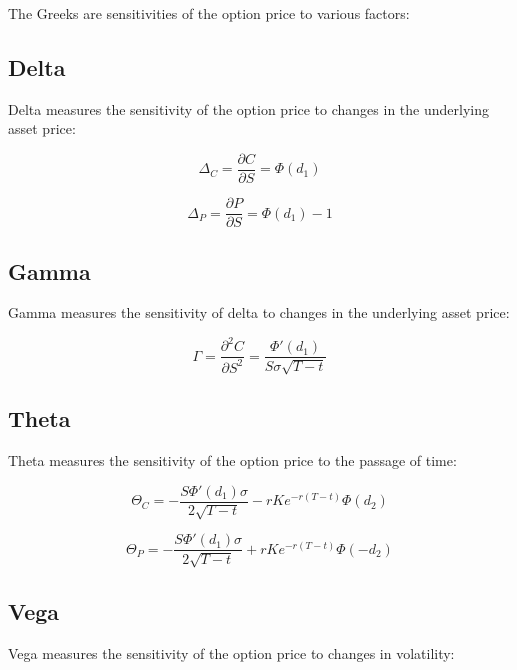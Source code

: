 \documentclass[../Main.tex]{subfiles}
\begin{document}
The Greeks are sensitivities of the option price to various factors:

\subsection{Delta}

Delta measures the sensitivity of the option price to changes in the underlying asset price:

\begin{equation}
    \Delta_C = \frac{\partial C}{\partial S} = \Phi(d_1)
\end{equation}

\begin{equation}
    \Delta_P = \frac{\partial P}{\partial S} = \Phi(d_1) - 1
\end{equation}

\subsection{Gamma}

Gamma measures the sensitivity of delta to changes in the underlying asset price:

\begin{equation}
    \Gamma = \frac{\partial^2 C}{\partial S^2} = \frac{\Phi'(d_1)}{S \sigma \sqrt{T - t}}
\end{equation}

\subsection{Theta}

Theta measures the sensitivity of the option price to the passage of time:

\begin{equation}
    \Theta_C = -\frac{S \Phi'(d_1) \sigma}{2 \sqrt{T - t}} - r K e^{-r(T - t)} \Phi(d_2)
\end{equation}

\begin{equation}
    \Theta_P = -\frac{S \Phi'(d_1) \sigma}{2 \sqrt{T - t}} + r K e^{-r(T - t)} \Phi(-d_2)
\end{equation}

\subsection{Vega}

Vega measures the sensitivity of the option price to changes in volatility:
\end{document}

